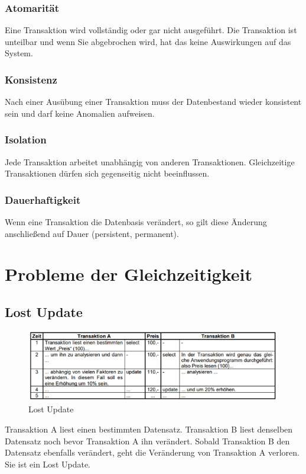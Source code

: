 \subsubsection*{Atomarität}
Eine Transaktion wird vollständig oder gar nicht ausgeführt. Die Transaktion ist unteilbar und wenn Sie abgebrochen wird, hat das keine Auswirkungen auf das System.

\subsubsection*{Konsistenz}
Nach einer Ausübung einer Transaktion muss der Datenbestand wieder konsistent sein und darf keine Anomalien aufweisen.

\subsubsection*{Isolation}
Jede Transaktion arbeitet unabhängig von anderen Transaktionen. Gleichzeitige Transaktionen dürfen sich gegenseitig nicht beeinflussen.

\subsubsection*{Dauerhaftigkeit}
Wenn eine Transaktion die Datenbasis verändert, so gilt diese Änderung anschließend auf Dauer (persistent, permanent).

\section{Probleme der Gleichzeitigkeit}

\subsection{Lost Update}
\begin{figure}[H]
\centering
    \includegraphics[width=.75\textwidth]{Content/images/gleichzeitigkeit/lostupdate.png}
    \caption{Lost Update}
\end{figure}
\noindent
Transaktion A liest einen bestimmten Datensatz. Transaktion B liest denselben Datensatz noch bevor Transaktion A ihn verändert. Sobald Transaktion B den Datensatz ebenfalls verändert, geht die Veränderung von Transaktion A verloren. Sie ist ein Lost Update.

